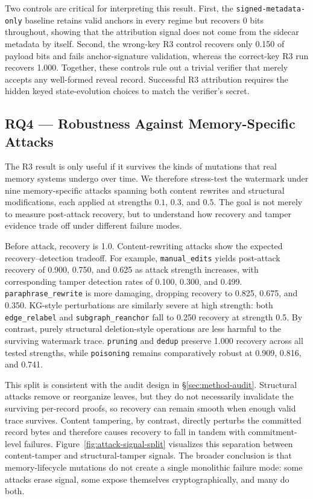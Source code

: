 Two controls are critical for interpreting this result. First, the
\texttt{signed-metadata-only} baseline retains valid anchors in every
regime but recovers 0 bits throughout, showing that the attribution
signal does not come from the sidecar metadata by itself. Second, the
wrong-key R3 control recovers only 0.150 of payload bits and fails
anchor-signature validation, whereas the correct-key R3 run recovers
1.000. Together, these controls rule out a trivial verifier that
merely accepts any well-formed reveal record. Successful R3
attribution requires the hidden keyed state-evolution choices to match
the verifier's secret.




\subsection{RQ4 — Robustness Against Memory-Specific Attacks}
\label{sec:rq4}
The R3 result is only useful if it survives the kinds of mutations that
real memory systems undergo over time. We therefore stress-test the
watermark under nine memory-specific attacks spanning both content
rewrites and structural modifications, each applied at strengths
$0.1$, $0.3$, and $0.5$. The goal is not merely to measure post-attack
recovery, but to understand how recovery and tamper evidence trade off
under different failure modes.

Before attack, recovery is 1.0. Content-rewriting attacks show the
expected recovery--detection tradeoff. For example,
\texttt{manual\_edits} yields post-attack recovery of 0.900, 0.750,
and 0.625 as attack strength increases, with corresponding tamper
detection rates of 0.100, 0.300, and 0.499.
\texttt{paraphrase\_rewrite} is more damaging, dropping recovery to
0.825, 0.675, and 0.350. KG-style perturbations are similarly severe
at high strength: both \texttt{edge\_relabel} and
\texttt{subgraph\_reanchor} fall to 0.250 recovery at strength 0.5.
By contrast, purely structural deletion-style operations are less
harmful to the surviving watermark trace. \texttt{pruning} and
\texttt{dedup} preserve 1.000 recovery across all tested strengths,
while \texttt{poisoning} remains comparatively robust at 0.909, 0.816,
and 0.741.

This split is consistent with the audit design in
\S\ref{sec:method-audit}. Structural attacks remove or reorganize
leaves, but they do not necessarily invalidate the surviving
per-record proofs, so recovery can remain smooth when enough valid
trace survives. Content tampering, by contrast, directly perturbs the
committed record bytes and therefore causes recovery to fall in tandem
with commitment-level failures. Figure~\ref{fig:attack-signal-split}
visualizes this separation between content-tamper and structural-tamper
signals. The broader conclusion is that memory-lifecycle mutations do
not create a single monolithic failure mode: some attacks erase signal,
some expose themselves cryptographically, and many do both.

